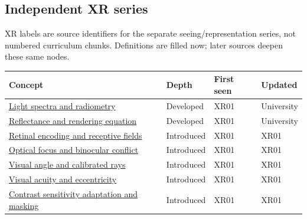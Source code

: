 \subsection{Independent XR series}\label{appendix-a6d556a4ef50-independent-xr-series}

XR labels are source identifiers for the separate seeing/representation series, not numbered curriculum chunks. Definitions are filled now; later sources deepen these same nodes.

{\def\LTcaptype{none} %
\begin{longtable}[]{@{}
  >{\raggedright\arraybackslash}p{}
  >{\raggedright\arraybackslash}p{}
  >{\raggedright\arraybackslash}p{}
  >{\raggedright\arraybackslash}p{}@{}}
\toprule\noalign{}
\begin{minipage}[b]{\linewidth}\raggedright
Concept
\end{minipage} & \begin{minipage}[b]{\linewidth}\raggedright
Depth
\end{minipage} & \begin{minipage}[b]{\linewidth}\raggedright
First seen
\end{minipage} & \begin{minipage}[b]{\linewidth}\raggedright
Updated
\end{minipage} \\
\midrule\noalign{}
\endhead
\bottomrule\noalign{}
\endlastfoot
\hyperref[appendix-215c2570199b]{Light spectra and radiometry} & Developed & XR01 & University \\
\hyperref[appendix-96da0b153b77]{Reflectance and rendering equation} & Developed & XR01 & University \\
\hyperref[appendix-7281c15ac44a]{Retinal encoding and receptive fields} & Introduced & XR01 & XR01 \\
\hyperref[appendix-f90cee1be7a4]{Optical focus and binocular conflict} & Introduced & XR01 & XR01 \\
\hyperref[appendix-7d356c396d1a]{Visual angle and calibrated rays} & Introduced & XR01 & XR01 \\
\hyperref[appendix-b491fc48c54b]{Visual acuity and eccentricity} & Introduced & XR01 & XR01 \\
\hyperref[appendix-b3aa9e8e01ad]{Contrast sensitivity adaptation and masking} & Introduced & XR01 & XR01 \\

\end{longtable}}

